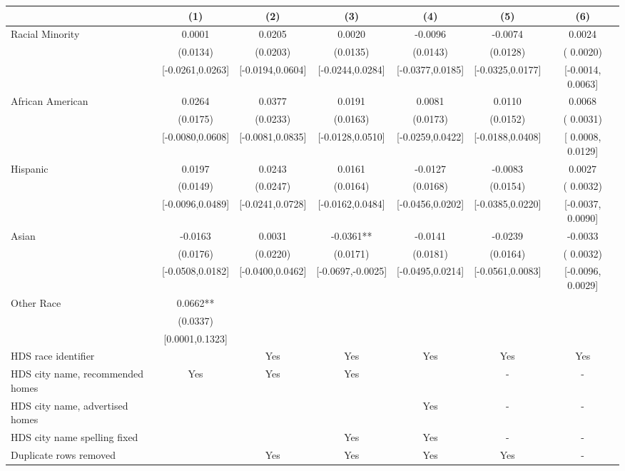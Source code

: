 \begin{table}[htbp]
{\begin{tabular}{l*{6}{c}}
                    \cmidrule(lr){2-2}\cmidrule(lr){3-3}\cmidrule(lr){4-4}\cmidrule(lr){5-5}\cmidrule(lr){6-6}\cmidrule(lr){7-7}
                    &\multicolumn{1}{c}{(1)}   &\multicolumn{1}{c}{(2)}   &\multicolumn{1}{c}{(3)}   &\multicolumn{1}{c}{(4)}   &\multicolumn{1}{c}{(5)}   &\multicolumn{1}{c}{(6)}\\
\midrule
Racial Minority & 0.0001 & 0.0205 & 0.0020 & -0.0096 & -0.0074 & 0.0024 \\
 & (0.0134) & (0.0203) & (0.0135) & (0.0143) & (0.0128) & ( 0.0020) \\
 & [-0.0261,0.0263] & [-0.0194,0.0604] & [-0.0244,0.0284] & [-0.0377,0.0185] & [-0.0325,0.0177] & [-0.0014,  0.0063] \\
\midrule
African American & 0.0264 & 0.0377 & 0.0191 & 0.0081 & 0.0110 & 0.0068\sym{**} \\
 & (0.0175) & (0.0233) & (0.0163) & (0.0173) & (0.0152) & ( 0.0031) \\
 & [-0.0080,0.0608] & [-0.0081,0.0835] & [-0.0128,0.0510] & [-0.0259,0.0422] & [-0.0188,0.0408] & [ 0.0008,  0.0129] \\
Hispanic & 0.0197 & 0.0243 & 0.0161 & -0.0127 & -0.0083 & 0.0027 \\
 & (0.0149) & (0.0247) & (0.0164) & (0.0168) & (0.0154) & ( 0.0032) \\
 & [-0.0096,0.0489] & [-0.0241,0.0728] & [-0.0162,0.0484] & [-0.0456,0.0202] & [-0.0385,0.0220] & [-0.0037,  0.0090] \\
Asian & -0.0163 & 0.0031 & -0.0361** & -0.0141 & -0.0239 & -0.0033 \\
 & (0.0176) & (0.0220) & (0.0171) & (0.0181) & (0.0164) & ( 0.0032) \\
 & [-0.0508,0.0182] & [-0.0400,0.0462] & [-0.0697,-0.0025] & [-0.0495,0.0214] & [-0.0561,0.0083] & [-0.0096,  0.0029] \\
Other Race & 0.0662** &  &  &  &  &  \\
 & (0.0337) &  &  &  &  &  \\
 & [0.0001,0.1323] &  &  &  &  &  \\
\midrule
HDS race identifier & & Yes & Yes & Yes & Yes & Yes \\
HDS city name, recommended homes & Yes & Yes & Yes & & - & -\\
HDS city name, advertised homes &  &  &  & Yes & - & -\\
HDS city name spelling fixed & & & Yes & Yes & - & -\\
Duplicate rows removed &  & Yes & Yes & Yes & Yes & - \\

\end{tabular}}
\end{table}
